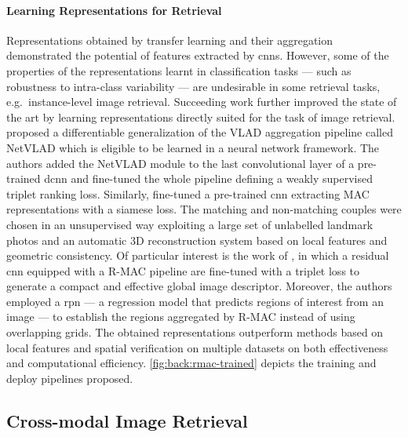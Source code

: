 \paragraph{Learning Representations for Retrieval}
Representations obtained by transfer learning and their aggregation demonstrated the potential of features extracted by \glspl{cnn}.
However, some of the properties of the representations learnt in classification tasks --- such as robustness to intra-class variability --- are undesirable in some retrieval tasks, e.g.\ instance-level image retrieval.
Succeeding work further improved the state of the art by learning representations directly suited for the task of image retrieval.
\citet{arandjelovic2016netvlad} proposed a differentiable generalization of the VLAD aggregation pipeline called NetVLAD which is eligible to be learned in a neural network framework.
The authors added the NetVLAD module to the last convolutional layer of a pre-trained \gls{dcnn} and fine-tuned the whole pipeline defining a weakly supervised triplet ranking loss.
Similarly, \citet{radenovic2016cnn} fine-tuned a pre-trained \gls{cnn} extracting MAC representations with a siamese loss.
The matching and non-matching couples were chosen in an unsupervised way exploiting a large set of unlabelled landmark photos and an automatic 3D reconstruction system based on local features and geometric consistency.
Of particular interest is the work of \citet{gordo2016deep,gordo2017end}, in which a residual \gls{cnn} equipped with a R-MAC pipeline are fine-tuned with a triplet loss to generate a compact and effective global image descriptor.
Moreover, the authors employed a \gls{rpn} --- a regression model that predicts regions of interest from an image --- to establish the regions aggregated by R-MAC instead of using overlapping grids.
The obtained representations outperform methods based on local features and spatial verification on multiple datasets on both effectiveness and computational efficiency.
\ref{fig:back:rmac-trained} depicts the training and deploy pipelines proposed.

\subsection{Cross-modal Image Retrieval}

